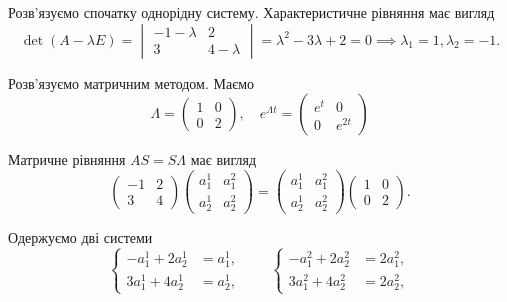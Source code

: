 \begin{solution}
	Розв'язуємо спочатку однорідну систему. Характеристичне рівняння має вигляд
	\begin{equation*}
		\det (A - \lambda E) = \begin{vmatrix} - 1 - \lambda & 2 \\ 3 & 4 - \lambda \end{vmatrix} = \lambda^2 - 3 \lambda + 2 = 0 \implies \lambda_1 = 1, \lambda_2 = -1.
	\end{equation*}

	Розв'язуємо матричним методом. Маємо
	\begin{equation*}
		\Lambda = \begin{pmatrix}
			1 & 0 \\ 0 & 2
		\end{pmatrix}, \quad 
		e^{\Lambda t} = \begin{pmatrix}
			e^t & 0 \\ 0 & e^{2t}
		\end{pmatrix}
	\end{equation*}

	Матричне рівняння $A S = S \Lambda$ має вигляд
	\begin{equation*}
		\begin{pmatrix} -1 & 2 \\ 3 & 4 \end{pmatrix} \begin{pmatrix} a_1^1 & a_1^2 \\ a_2^1 & a_2^2 \end{pmatrix} = \begin{pmatrix} a_1^1 & a_1^2 \\ a_2^1 & a_2^2 \end{pmatrix} \begin{pmatrix} 1 & 0 \\ 0 & 2 \end{pmatrix}.
	\end{equation*}
 
	Одержуємо дві системи 
	\begin{equation*}
		\left\{
			\begin{aligned}
				- a_1^1 + 2 a_2^1 &= a_1^1, \\
				3 a_1^1 + 4 a_2^1 &= a_2^1,
			\end{aligned}
		\right.
		\qquad
		\left\{
			\begin{aligned}
				- a_1^2 + 2 a_2^2 &= 2 a_1^2, \\
				3 a_1^2 + 4 a_2^2 &= 2 a_2^2,
			\end{aligned}
		\right.
	\end{equation*}


\end{solution}

